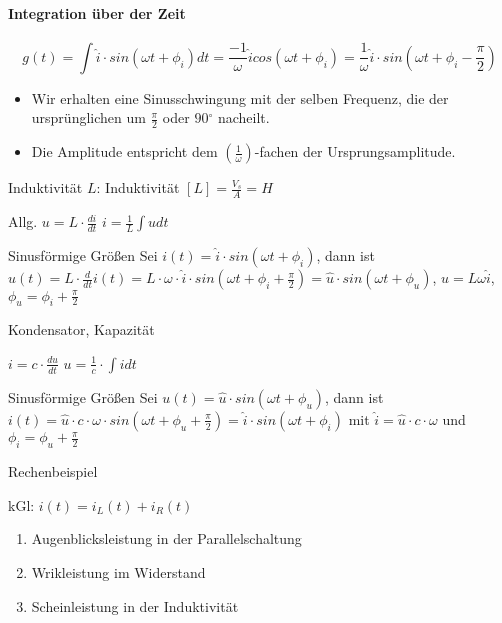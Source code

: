 \documentclass[german]{article}
\newcommand{\degree}{\ensuremath{^\circ}}
\begin{document}
\paragraph{Integration über der Zeit}
\[ g(t) = \int \hat{i} \cdot sin(\omega t + \phi_i) dt = \frac{-1}{\omega} \hat{i} cos(\omega t + \phi_i) = \frac1{\omega} \hat{i} \cdot sin(\omega t + \phi_i - \frac{\pi}2) \]
\begin{itemize}
	\item Wir erhalten eine Sinusschwingung mit der selben Frequenz, die der ursprünglichen um $\frac{\pi}2$ oder $90\degree$ nacheilt.
	\item Die Amplitude entspricht dem $\left( \frac1{\omega} \right)$-fachen der Ursprungsamplitude.
\end{itemize}

Induktivität
$L$: Induktivität
$[L] = \frac{V_s}A = H$


Allg. $u = L \cdot \frac{di}{dt}$ $i = \frac1L \int u dt$

Sinusförmige Größen
Sei $i(t) = \hat{i} \cdot sin(\omega t + \phi_i)$, dann ist $u(t) = L \cdot \frac{d}{dt} i(t) = L \cdot \omega \cdot \hat{i} \cdot sin(\omega t + \phi_i + \frac{\pi}2) = \hat{u} \cdot sin(\omega t + \phi_u)$, $\hat{u} = L \omega \hat{i}$, $\phi_u = \phi_i + \frac{\pi}2$

Kondensator, Kapazität

$i = c \cdot \frac{du}{dt}$
$u = \frac1c \cdot \int i dt$

Sinusförmige Größen
Sei $u(t) = \hat{u} \cdot sin(\omega t + \phi_u)$, dann ist $i(t) = \hat{u} \cdot c \cdot \omega \cdot sin(\omega t + \phi_u + \frac{\pi}2) = \hat{i} \cdot sin(\omega t + \phi_i)$ mit $\hat{i} = \hat{u} \cdot c \cdot \omega$ und $\phi_i = \phi_u + \frac{\pi}2$

Rechenbeispiel

kGl: $i(t) = i_L(t) + i_R(t)$

\begin{enumerate}
	\item Augenblicksleistung in der Parallelschaltung
	\item Wrikleistung im Widerstand
	\item Scheinleistung in der Induktivität
\end{enumerate}
\end{document}

